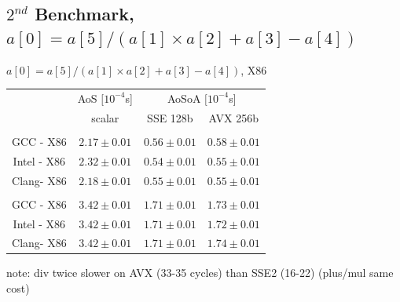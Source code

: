 \documentclass{beamer}
\begin{document}
\subsection*{$2^{nd}$ Benchmark, $a[0] = a[5]/(a[1] \times a[2]+a[3]-a[4])$}
\begin{frame}[fragile]
\centering
$a[0] = a[5]/(a[1] \times a[2]+a[3]-a[4])$, X86
\vspace{0.5cm}

\begin{tabular}{ c  c | c c }
           & AoS $[10^{-4}$s]& \multicolumn{2}{c}{AoSoA $[10^{-4}$s]}\\
                        & scalar & SSE 128b & AVX 256b \\
                        \hline
\color{C0}{float} & & & \\
   GCC - X86  & $2.17\pm0.01$  &\cellcolor{C2} $0.56\pm0.01$ & $0.58\pm 0.01$ \\
   Intel  - X86   & $2.32\pm0.01$ & \cellcolor{C2}$0.54\pm0.01$ & $0.55 \pm 0.01$\\
   Clang- X86  & $2.18\pm0.01$  & $0.55\pm0.01$ & \cellcolor{C2}$0.55 \pm 0.01$ \\
      \hline
        \color{C0}{double}                     &  & & \\
   GCC - X86  & $3.42\pm0.01$   & \cellcolor{C2}$1.71\pm0.01$ & $1.73\pm0.01$ \\
   Intel  - X86   & $3.42\pm0.01$  & \cellcolor{C2}$1.71\pm0.01$ & $1.72\pm0.01$\\
   Clang- X86  & $3.42\pm0.01$  & \cellcolor{C2}$1.71\pm0.01$ & $1.74\pm0.01$\\
   \hline

\end{tabular}
\vspace{0.5cm}

note:  div twice slower on AVX (33-35 cycles) than SSE2 (16-22) (plus/mul same cost)
\end{frame}

\end{document}
